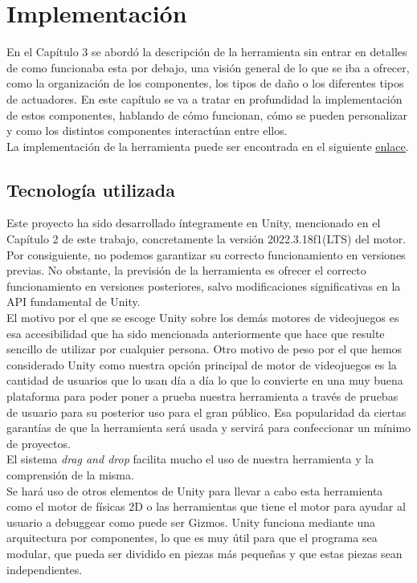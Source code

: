 \setcounter{secnumdepth}{3} %
\chapter{Implementaci\'on}
\label{cap:implementacion}
En el Capítulo 3 se abordó la descripción de la herramienta sin entrar en detalles de como funcionaba esta por debajo, una visión general de lo que se iba a ofrecer, como la organización de los componentes, los tipos de daño o los diferentes tipos de actuadores. En este capítulo se va a tratar en profundidad la implementación de estos componentes, hablando de cómo funcionan, cómo se pueden personalizar y como los distintos componentes interactúan entre ellos.\\

La implementación de la herramienta puede ser encontrada en el siguiente \href{https://github.com/CiscoGalvan/TFG}{\underline{enlace}}.


\section{Tecnología utilizada}
Este proyecto ha sido desarrollado íntegramente en Unity, mencionado en el Capítulo 2 de este trabajo, concretamente la versión 2022.3.18f1(LTS) del motor. Por consiguiente, no podemos garantizar su correcto funcionamiento en versiones previas. No obstante, la previsión de la herramienta es ofrecer el correcto funcionamiento en versiones posteriores, salvo modificaciones significativas en la API fundamental de Unity.\\

El motivo por el que se escoge Unity sobre los demás motores de videojuegos es esa accesibilidad que ha sido mencionada anteriormente que hace que resulte sencillo de utilizar por cualquier persona. Otro motivo de peso por el que hemos considerado Unity como nuestra opción principal de motor de videojuegos es la cantidad de usuarios que lo usan día a día lo que lo convierte en una muy buena plataforma para poder poner a prueba nuestra herramienta a través de pruebas de usuario para su posterior uso para el gran público. Esa popularidad da ciertas garantías de que la herramienta será usada y servirá para confeccionar un mínimo de proyectos.\\
El sistema \textit{drag and drop} facilita mucho el uso de nuestra herramienta y la comprensión de la misma.\\

Se hará uso de otros elementos de Unity para llevar a cabo esta herramienta como el motor de físicas 2D o las herramientas que tiene el motor para ayudar al usuario a debuggear como puede ser Gizmos.
Unity funciona mediante una arquitectura por componentes, lo que es muy útil para que el programa sea modular, que pueda ser dividido en piezas más pequeñas y que estas piezas sean independientes.\\

